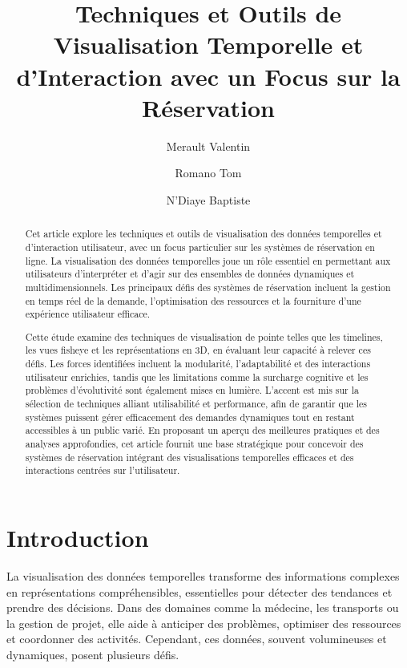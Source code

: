 \documentclass[runningheads]{llncs}
\begin{document}
\title{Techniques et Outils de Visualisation Temporelle et d'Interaction avec un Focus sur la Réservation}

\author{Merault Valentin \and
Romano Tom \and
N'Diaye Baptiste}



\maketitle

\begin{abstract}
Cet article explore les techniques et outils de visualisation des données temporelles et d'interaction utilisateur, avec un focus particulier sur les systèmes de réservation en ligne. La visualisation des données temporelles joue un rôle essentiel en permettant aux utilisateurs d'interpréter et d'agir sur des ensembles de données dynamiques et multidimensionnels. Les principaux défis des systèmes de réservation incluent la gestion en temps réel de la demande, l'optimisation des ressources et la fourniture d'une expérience utilisateur efficace.

Cette étude examine des techniques de visualisation de pointe telles que les timelines, les vues fisheye et les représentations en 3D, en évaluant leur capacité à relever ces défis. Les forces identifiées incluent la modularité, l’adaptabilité et des interactions utilisateur enrichies, tandis que les limitations comme la surcharge cognitive et les problèmes d’évolutivité sont également mises en lumière. L'accent est mis sur la sélection de techniques alliant utilisabilité et performance, afin de garantir que les systèmes puissent gérer efficacement des demandes dynamiques tout en restant accessibles à un public varié. En proposant un aperçu des meilleures pratiques et des analyses approfondies, cet article fournit une base stratégique pour concevoir des systèmes de réservation intégrant des visualisations temporelles efficaces et des interactions centrées sur l'utilisateur.

\end{abstract}

\section{Introduction}
La visualisation des données temporelles transforme des informations complexes en représentations compréhensibles, essentielles pour détecter des tendances et prendre des décisions. Dans des domaines comme la médecine, les transports ou la gestion de projet, elle aide à anticiper des problèmes, optimiser des ressources et coordonner des activités. Cependant, ces données, souvent volumineuses et dynamiques, posent plusieurs défis.
\end{document}
